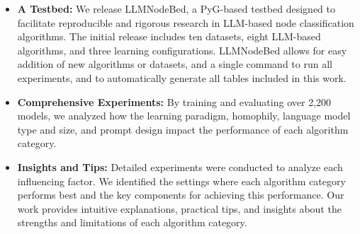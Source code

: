 

\begin{itemize}
    \item \textbf{A Testbed:} We release LLMNodeBed, a PyG-based testbed designed to facilitate reproducible and rigorous research in LLM-based node classification algorithms. The initial release includes ten datasets, eight LLM-based algorithms, and three learning configurations. LLMNodeBed allows for easy addition of new algorithms or datasets, and a single command to run all experiments, and to automatically generate all tables included in this work.
    
    \item \textbf{Comprehensive Experiments:} By training and evaluating over 2,200 models, we analyzed how the learning paradigm, homophily, language model type and size, and prompt design impact the performance of each algorithm category.
    
    \item \textbf{Insights and Tips:} Detailed experiments were conducted to analyze each influencing factor. We identified the settings where each algorithm category performs best and the key components for achieving this performance. Our work provides intuitive explanations, practical tips, and insights about the strengths and limitations of each algorithm category.
\end{itemize}







